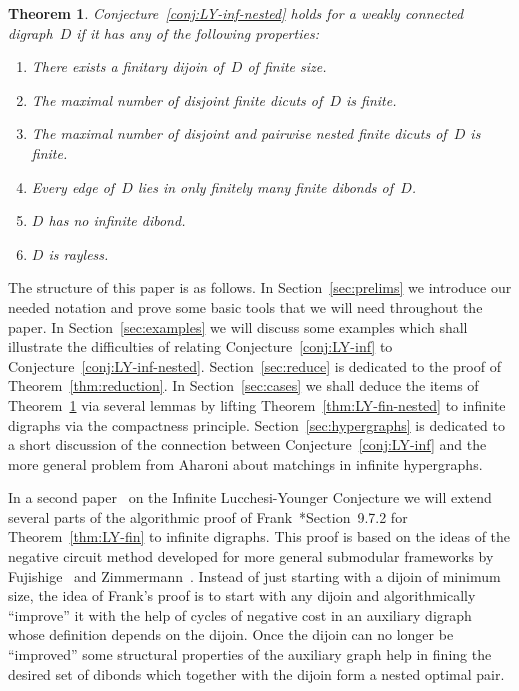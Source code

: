 \documentclass[reqno, 12pt]{amsart}
\numberwithin{equation}{section}
\numberwithin{figure}{section}
\theoremstyle{plain}
\newtheorem{theorem}[thm]{Theorem}
\theoremstyle{definition}
\begin{document}
\begin{theorem}
    \label{thm:LY-inf-cases}
    Conjecture~\ref{conj:LY-inf-nested} holds for a weakly connected digraph~$D$ if it has any of the following properties:
    \begin{enumerate}[label=(\roman*)]
        \item \label{item:LY-fin-dijoin}
            There exists a finitary dijoin of~$D$ of finite size. 
        \item \label{item:LY-fin-disj-dicuts}
            The maximal number of disjoint finite dicuts of~$D$ is finite. 
        \item \label{item:LY-fin-nested-disj-dicuts}
            The maximal number of disjoint and pairwise nested finite dicuts of~$D$ is finite. 
        \item \label{item:LY-edge-fin-dibonds}
            Every edge of~$D$ lies in only finitely many finite dibonds of~$D$. 
        \item \label{item:LY-fin-dibonds}
            $D$ has no infinite dibond. 
        \item \label{item:LY-rayless}
            $D$ is rayless. 
    \end{enumerate}
\end{theorem}

The structure of this paper is as follows.
In Section~\ref{sec:prelims} we introduce our needed notation and prove some basic tools that we will need throughout the paper. 
In Section~\ref{sec:examples} we will discuss some examples which shall illustrate the difficulties of relating Conjecture~\ref{conj:LY-inf} to Conjecture~\ref{conj:LY-inf-nested}. 
Section~\ref{sec:reduce} is dedicated to the proof of Theorem~\ref{thm:reduction}.
In Section~\ref{sec:cases} we shall deduce the items of Theorem~\ref{thm:LY-inf-cases} via several lemmas by lifting Theorem~\ref{thm:LY-fin-nested} to infinite digraphs via the compactness principle. 
Section~\ref{sec:hypergraphs} is dedicated to a short discussion of the connection between Conjecture~\ref{conj:LY-inf} and the more general problem from Aharoni about matchings in infinite hypergraphs. 

\vspace{0.2cm}

In a second paper~\cite{inf-LY:2} on the Infinite Lucchesi-Younger Conjecture we will extend several parts of the algorithmic proof of Frank~\cite{frank_book}*{Section~9.7.2} for Theorem~\ref{thm:LY-fin} to infinite digraphs. 
This proof is based on the ideas of the negative circuit method developed for more general submodular frameworks by Fujishige~\cite{fujishige} and Zimmermann~\cite{zimmermann}. 
Instead of just starting with a dijoin of minimum size, the idea of Frank's proof is to start with any dijoin and algorithmically ``improve'' it with the help of cycles of negative cost in an auxiliary digraph whose definition depends on the dijoin. 
Once the dijoin can no longer be ``improved'' some structural properties of the auxiliary graph help in fining the desired set of dibonds which together with the dijoin form a nested optimal pair.
\end{document}
